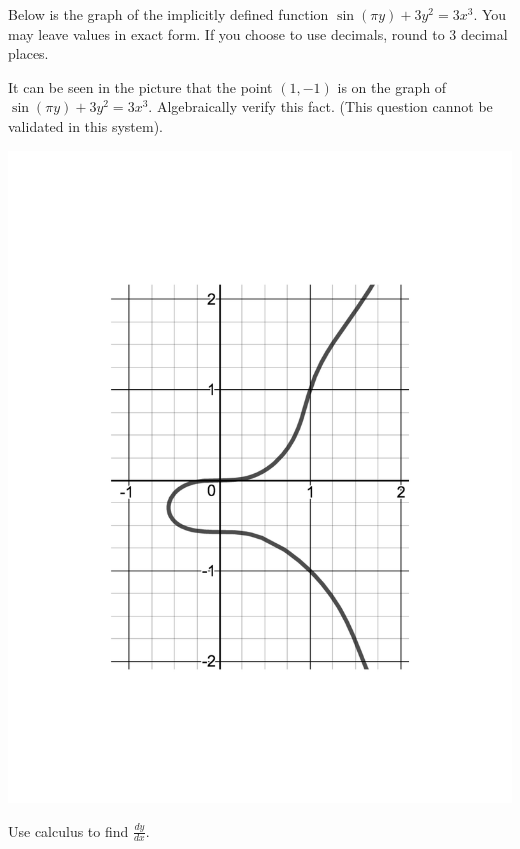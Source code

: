 \documentclass[handout]{ximera}
\begin{document}
\begin{problem}
Below is the graph of the implicitly defined function $\displaystyle\sin \left(\pi y\right)+3y^2=3x^3$. You may leave values in exact form. If you choose to use decimals, round to 3 decimal places.


	\begin{question}
	It can be seen in the picture that the point $(1,-1)$ is on the graph of $\displaystyle\sin \left(\pi y\right)+3y^2=3x^3$. Algebraically verify this fact. (This question cannot be validated in this system).\\
    \begin{freeResponse}
    \end{freeResponse}

    \includegraphics[scale=0.4]{Exam2-ImpDiff2.pdf}
    \end{question}
    
	
	\begin{question}
    Use calculus to find $\displaystyle\frac{dy}{dx}$.\\
    

\end{question}
\end{problem}
\end{document}
